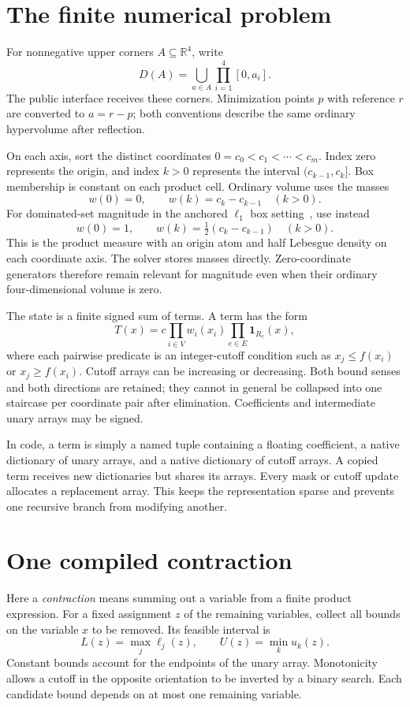 \documentclass[12pt,a4paper]{article}
\begin{document}
\section{The finite numerical problem}
For nonnegative upper corners $A\subseteq\mathbb R^4$, write
\[
 D(A)=\bigcup_{a\in A}\prod_{i=1}^4[0,a_i].
\]
The public interface receives these corners. Minimization points $p$ with
reference $r$ are converted to $a=r-p$; both conventions describe the same
ordinary hypervolume after reflection.

On each axis, sort the distinct coordinates
$0=c_0<c_1<\cdots<c_m$. Index zero represents the origin, and index $k>0$
represents the interval $(c_{k-1},c_k]$. Box membership is constant on each
product cell. Ordinary volume uses the masses
\[
 w(0)=0,\qquad w(k)=c_k-c_{k-1}\quad(k>0).
\]
For dominated-set magnitude in the anchored $\ell_1$ box setting~\cite{magnitude},
use instead
\[
 w(0)=1,\qquad w(k)=\tfrac12(c_k-c_{k-1})\quad(k>0).
\]
This is the product measure with an origin atom and half Lebesgue density on
each coordinate axis. The solver stores masses directly. Zero-coordinate
generators therefore remain relevant for magnitude even when their ordinary
four-dimensional volume is zero.

The state is a finite signed sum of terms. A term has the form
\begin{equation}
 T(x)=c\prod_{i\in V}w_i(x_i)
       \prod_{e\in E}\mathbf 1_{R_e}(x),
 \label{eq:term}
\end{equation}
where each pairwise predicate is an integer-cutoff condition such as
$x_j\le f(x_i)$ or $x_j\ge f(x_i)$. Cutoff arrays can be increasing or
decreasing. Both bound senses and both directions are retained; they cannot
in general be collapsed into one staircase per coordinate pair after
elimination. Coefficients and intermediate unary arrays may be signed.

In code, a term is simply a named tuple containing a floating coefficient,
a native dictionary of unary arrays, and a native dictionary of cutoff arrays.
A copied term receives new dictionaries but shares its arrays. Every mask or
cutoff update allocates a replacement array. This keeps the representation
sparse and prevents one recursive branch from modifying another.

\section{One compiled contraction}
Here a \emph{contraction} means summing out a variable from a finite product
expression. For a fixed assignment $z$ of the remaining variables, collect
all bounds on the variable $x$ to be removed. Its feasible interval is
\[
 L(z)=\max_j\ell_j(z),\qquad U(z)=\min_k u_k(z).
\]
Constant bounds account for the endpoints of the unary array. Monotonicity
allows a cutoff in the opposite orientation to be inverted by a binary search.
Each candidate bound depends on at most one remaining variable.
\end{document}
